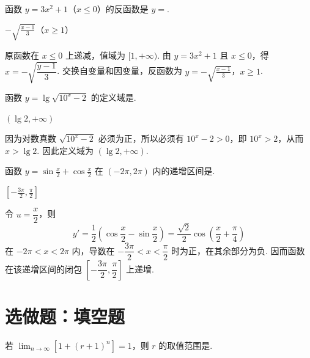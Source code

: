 \begin{problem}
函数 \(y=3x^2+1\)（\(x\leqslant 0\)）的反函数是 \(y=\)\fillinblank{}.
\end{problem}

\begin{answer}
\(-\sqrt{\frac{x-1}{3}}\)（\(x\geqslant1\)）
\end{answer}

\begin{solution}
原函数在 \(x\leqslant0\) 上递减，值域为 \([1,+\infty)\). 由 \(y=3x^2+1\) 且 \(x\leqslant0\)，得 \(x=-\sqrt{\dfrac{y-1}{3}}\). 交换自变量和因变量，反函数为
\(y=-\sqrt{\frac{x-1}{3}}\)，\(x\geqslant1\).
\end{solution}

\begin{problem}
函数 \(y=\lg\sqrt{10^{x}-2} \) 的定义域是\fillinblank{}.
\end{problem}

\begin{answer}
\((\lg2,+\infty)\)
\end{answer}

\begin{solution}
因为对数真数 \(\sqrt{10^x-2}\) 必须为正，所以必须有 \(10^x-2>0\)，即 \(10^x>2\)，从而 \(x>\lg2\). 因此定义域为 \((\lg2,+\infty)\).
\end{solution}

\begin{problem}
函数 \(y=\sin\frac{x}{2}+\cos\frac{x}{2} \) 在 \((-2\pi,2\pi) \) 内的递增区间是\fillinblank{}.
\end{problem}

\begin{answer}
\(\left[-\frac{3\pi}{2},\frac{\pi}{2}\right]\)
\end{answer}

\begin{solution}
令 \(u=\dfrac{x}{2}\)，则
\[
y'=\frac12\left(\cos\frac{x}{2}-\sin\frac{x}{2}\right)=\frac{\sqrt2}{2}\cos\left(\frac{x}{2}+\frac{\pi}{4}\right)
\]
在 \(-2\pi<x<2\pi\) 内，导数在 \(-\dfrac{3\pi}{2}<x<\dfrac{\pi}{2}\) 时为正，在其余部分为负. 因而函数在该递增区间的闭包 \(\left[-\dfrac{3\pi}{2},\dfrac{\pi}{2}\right]\) 上递增.
\end{solution}

\section{选做题：填空题}

\begin{problem}[A]
若 \(\displaystyle\lim_{n\to\infty}\left[1+(r+1)^n\right]=1\)，则 \(r\) 的取值范围是\fillinblank{}.
\end{problem}

